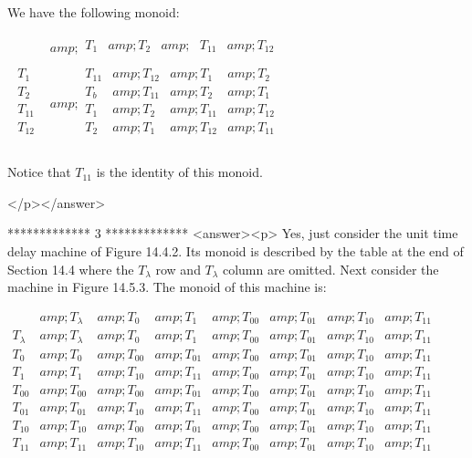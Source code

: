 We have the following monoid:



          \(\begin{array}{c|c}
   &amp; 
\begin{array}{cccc}
 T_1 &amp;  T_2 &amp; \text{  }T_{11} &amp;  T_{12} \\
\end{array}
 \\
\hline
 
\begin{array}{c}
 T_1 \\
 T_2 \\
 T_{11} \\
 T_{12} \\
\end{array}
 &amp; 
\begin{array}{cccc}
 T_{11} &amp; T_{12} &amp; T_1 &amp; T_2 \\
 T_b &amp; T_{11} &amp; T_2 &amp; T_1 \\
 T_1 &amp; T_2 &amp; T_{11} &amp; T_{12} \\
 T_2 &amp; T_1 &amp; T_{12} &amp; T_{11} \\
\end{array}
 \\
\end{array}\)



Notice that \(T_{11}\) is the identity of this monoid.

</p></answer>


*************
3
*************
<answer><p> Yes, just consider the unit time delay machine of Figure 14.4.2. Its monoid is described by the table at the end of Section 14.4 where the \(T_{\lambda
}\) row and \(T_{\lambda }\) column are omitted. Next consider the machine in Figure 14.5.3. The monoid of this machine is:



     \(\begin{array}{c|ccccccc}
   &amp; T_{\lambda } &amp; T_0 &amp; T_1 &amp; T_{00} &amp; T_{01} &amp; T_{10} &amp; T_{11} \\
\hline
 T_{\lambda } &amp; T_{\lambda } &amp; T_0 &amp; T_1 &amp; T_{00} &amp; T_{01} &amp; T_{10} &amp; T_{11} \\
\hline
 T_0 &amp; T_0 &amp; T_{00} &amp; T_{01} &amp; T_{00} &amp; T_{01} &amp; T_{10} &amp; T_{11} \\
 T_1 &amp; T_1 &amp; T_{10} &amp; T_{11} &amp; T_{00} &amp; T_{01} &amp; T_{10} &amp; T_{11} \\
 T_{00} &amp; T_{00} &amp; T_{00} &amp; T_{01} &amp; T_{00} &amp; T_{01} &amp; T_{10} &amp; T_{11} \\
 T_{01} &amp; T_{01} &amp; T_{10} &amp; T_{11} &amp; T_{00} &amp; T_{01} &amp; T_{10} &amp; T_{11} \\
 T_{10} &amp; T_{10} &amp; T_{00} &amp; T_{01} &amp; T_{00} &amp; T_{01} &amp; T_{10} &amp; T_{11} \\
 T_{11} &amp; T_{11} &amp; T_{10} &amp; T_{11} &amp; T_{00} &amp; T_{01} &amp; T_{10} &amp; T_{11} \\
\end{array}\)



